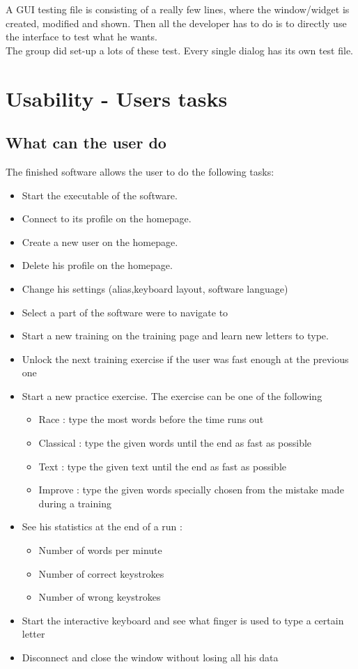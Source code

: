 A GUI testing file is consisting of a really few lines, where the window/widget is created, modified and shown. Then all the developer has to do is to directly use the interface to test what he wants.\\
The group did set-up a lots of these test. Every single dialog has its own test file.


\part{Usability - Users tasks}

\chapter{What can the user do}
The finished software allows the user to do the following tasks:
\begin{itemize}
	\item Start the executable of the software.
	\item Connect to its profile on the homepage.
	\item Create a new user on the homepage.
	\item Delete his profile on the homepage.
	\item Change his settings (alias,keyboard layout, software language)
	\item Select a part of the software were to navigate to
	\item Start a new training on the training page and learn new letters to type.
	\item Unlock the next training exercise if the user was fast enough at the previous one
	\item Start a new practice exercise. The exercise can be one of the following 
	\begin{itemize}
		\item Race : type the most words before the time runs out
		\item Classical : type the given words until the end as fast as possible
		\item Text : type the given text until the end as fast as possible
		\item Improve : type the given words specially chosen from the mistake made during a training
	\end{itemize}
	\item See his statistics at the end of a run :
	\begin{itemize}
		\item Number of words per minute
		\item Number of correct keystrokes
		\item Number of wrong keystrokes
	\end{itemize}
	\item Start the interactive keyboard and see what finger is used to type a certain letter
	\item Disconnect and close the window without losing all his data
\end{itemize}



